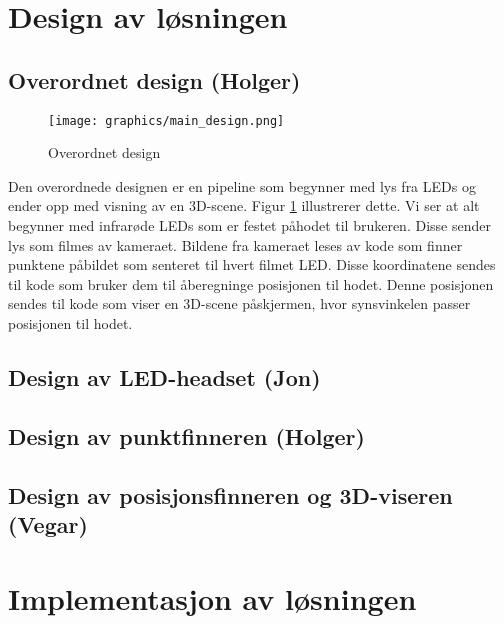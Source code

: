 \section{Design av l\o sningen}

	\subsection{Overordnet design (Holger)}
	
		\begin{figure}[h]
		\centering
		\texttt{[image: graphics/main\_design.png]}
		\caption{Overordnet design}
		\label{fig:main_design}
		\end{figure}
		
		Den overordnede designen er en pipeline som begynner med lys fra LEDs og ender opp med visning av en 3D-scene. Figur \ref{fig:main_design} illustrerer dette. Vi ser at alt begynner med infrar\o de LEDs som er festet p\aa \space hodet til brukeren. Disse sender lys som filmes av kameraet. Bildene fra kameraet leses av kode som finner punktene p\aa \space bildet som senteret til hvert filmet LED. Disse koordinatene sendes til kode som bruker dem til \aa \space beregninge posisjonen til hodet. Denne posisjonen sendes til kode som viser en 3D-scene p\aa \space skjermen, hvor synsvinkelen passer posisjonen til hodet.
	
	\subsection{Design av LED-headset (Jon)}
	
		
	
	\subsection{Design av punktfinneren (Holger)}
	
			
	\subsection{Design av posisjonsfinneren og 3D-viseren (Vegar)}
	
		
	
\section{Implementasjon av l\o sningen}

	